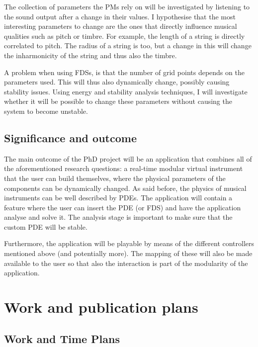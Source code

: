 The collection of parameters the PMs rely on will be investigated by listening to the sound output after a change in their values. I hypothesise that the most interesting parameters to change are the ones that directly influence musical qualities such as pitch or timbre. For example, the length of a string is directly correlated to pitch. The radius of a string is too, but a change in this will change the inharmonicity of the string and thus also the timbre.

A problem when using FDSs, is that the number of grid points depends on the parameters used. This will thus also dynamically change, possibly causing stability issues. Using energy and stability analysis techniques, I will investigate whether it will be possible to change these parameters without causing the system to become unstable.

\subsection{Significance and outcome}

The main outcome of the PhD project will be an application that combines all of the aforementioned research questions: a real-time modular virtual instrument that the user can build themselves, where the physical parameters of the components can be dynamically changed. As said before, the physics of musical instruments can be well described by PDEs. The application will contain a feature where the user can insert the PDE (or FDS) and have the application analyse and solve it. The analysis stage is important to make sure that the custom PDE will be stable. 

Furthermore, the application will be playable by means of the different controllers mentioned above (and potentially more). The mapping of these will also be made available to the user so that also the interaction is part of the modularity of the application.

\section{Work and publication plans}
\subsection{Work and Time Plans}

